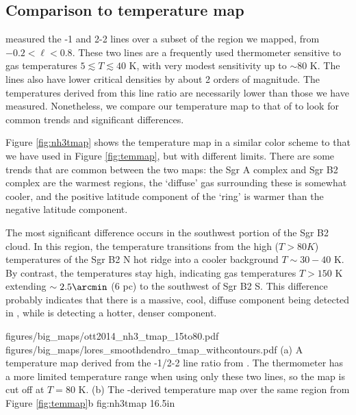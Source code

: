 \subsection{Comparison to \citet{Ott2014a} \ammonia temperature map}
\label{sec:ammoniacompare}
\citet{Ott2014a} measured the -1 and 2-2 lines over a subset of the
region we mapped, from $-0.2 < \ell < 0.8$.  These two lines are a frequently
used thermometer sensitive to gas temperatures $5 \lesssim T \lesssim 40$ K,
with very modest sensitivity up to $\sim80$ K.  The \ammonia lines also have
lower critical densities by about 2 orders of magnitude.  The temperatures
derived from this line ratio are necessarily lower than those we have measured.
Nonetheless, we compare our temperature map to that of \citet{Ott2014a} to look
for common trends and significant differences.

Figure \ref{fig:nh3tmap} shows the \citet{Ott2014a} temperature map in a
similar color scheme to that we have used in Figure \ref{fig:temmap}, but with
different limits.  There are some trends that are common between the two maps:
the Sgr A complex and Sgr B2 complex are the warmest regions, the `diffuse' gas
surrounding these is somewhat cooler, and the positive latitude component of
the \citet{Molinari2011a} `ring' is warmer than the negative latitude
component.

The most significant difference occurs in the southwest portion of the Sgr B2
cloud.  In this region, the \ammonia temperature transitions from the high
($T>80K$) temperatures of the Sgr B2 N hot ridge into a cooler background
$T\sim30-40$ K.  By contrast, the \formaldehyde temperatures stay high,
indicating gas temperatures $T>150$ K extending $\sim2.5\arcmin$ (6 pc) to the
southwest of Sgr B2 S.  This difference probably indicates that there is a
massive, cool, diffuse component being detected in \ammonia, while
\formaldehyde is detecting a hotter, denser component.

\FigureTwoAA
{figures/big_maps/ott2014_nh3_tmap_15to80.pdf}
{figures/big_maps/lores_smoothdendro_tmap_withcontours.pdf}
{(a) A temperature map derived from the -1/2-2 line ratio from
\citet{Ott2014a}.  The \ammonia thermometer has a more limited temperature
range when using only these two lines, so the map is cut off at $T=80$ K.
(b) The \para-derived temperature map over the same region from Figure
\ref{fig:temmap}b
}
{fig:nh3tmap}
{1}{6.5in}

